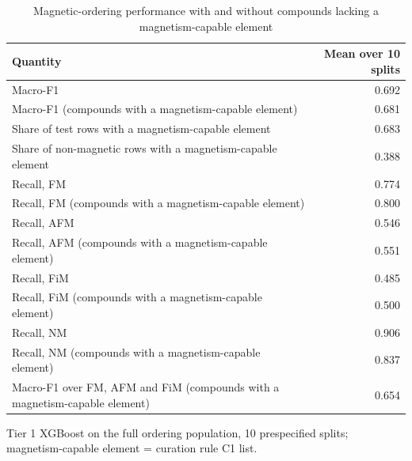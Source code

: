 \begin{table}
\caption{Magnetic-ordering performance with and without compounds lacking a magnetism-capable element}
\label{tab:tableS7_ordering_decomposition}
\tablefont
\begin{tabularx}{\textwidth}{@{}>{\raggedright\arraybackslash}Xr@{}}
\toprule
\textbf{Quantity} & \textbf{Mean over 10 splits} \\
\midrule
Macro-F1 & 0.692 \\
Macro-F1 (compounds with a magnetism-capable element) & 0.681 \\
Share of test rows with a magnetism-capable element & 0.683 \\
Share of non-magnetic rows with a magnetism-capable element & 0.388 \\
Recall, FM & 0.774 \\
Recall, FM (compounds with a magnetism-capable element) & 0.800 \\
Recall, AFM & 0.546 \\
Recall, AFM (compounds with a magnetism-capable element) & 0.551 \\
Recall, FiM & 0.485 \\
Recall, FiM (compounds with a magnetism-capable element) & 0.500 \\
Recall, NM & 0.906 \\
Recall, NM (compounds with a magnetism-capable element) & 0.837 \\
Macro-F1 over FM, AFM and FiM (compounds with a magnetism-capable element) & 0.654 \\
\bottomrule
\end{tabularx}
\par\vspace{4pt}\raggedright\noindent Tier 1 XGBoost on the full ordering population, 10 prespecified splits; magnetism-capable element = curation rule C1 list.
\end{table}
